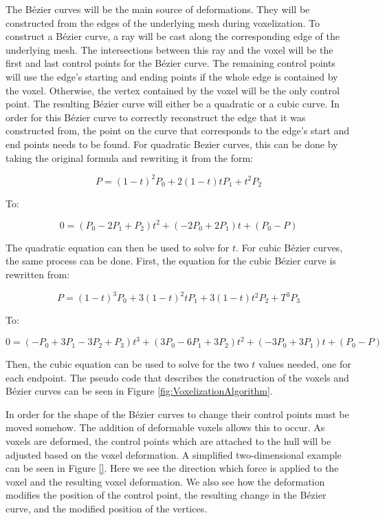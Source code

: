 The Bézier curves will be the main source of deformations. They will be constructed from the edges
of the underlying mesh during voxelization. To construct a Bézier curve, a ray will be cast along 
the corresponding edge of the underlying mesh. The intersections between this ray and the voxel will
be the first and last control points for the Bézier curve. The remaining control points will use the
edge's starting and ending points if the whole edge is contained by the voxel. Otherwise, the vertex
contained by the voxel will be the only control point. The resulting Bézier curve will either be a
quadratic or a cubic curve. In order for this Bézier curve to correctly reconstruct the edge that it
was constructed from, the point on the curve that corresponds to the edge's start and end points 
needs to be found. For quadratic Bezier curves, this can be done by taking the original formula and
rewriting it from the form:

\[P = (1 - t)^2P_0 + 2(1 - t)tP_1 + t^2 P_2\]

\begin{center}
To:
\end{center}
  
\[0 = (P_0 - 2P_1 + P_2)t^2 + (-2P_0 + 2P_1)t + (P_0 - P)\]

The quadratic equation can then be used to solve for \(t\). For cubic Bézier curves, the same 
process can be done. First, the equation for the cubic Bézier curve is rewritten from:

\[P = (1 - t)^3P_0 + 3(1 - t)^2tP_1 + 3(1 - t)t^2P_2 + T^3P_3\]

\begin{center}
To:
\end{center}

\[0 = (-P_0 + 3P_1 - 3P_2 + P_3)t^3 + (3P_0 - 6P_1 + 3P_2)t^2 + (-3P_0 + 3P_1)t + (P_0 - P)\]

Then, the cubic equation can be used to solve for the two \(t\) values needed, one for each 
endpoint. The pseudo code that describes the construction of the voxels and Bézier curves can be 
seen in Figure \ref{fig:VoxelizationAlgorithm}.

In order for the shape of the Bézier curves to change their control points must be moved somehow.
The addition of deformable voxels allows this to occur. As voxels are deformed, the control points
which are attached to the hull will be adjusted based on the voxel deformation. A simplified 
two-dimensional example can be seen in Figure \ref{}. Here we see the direction which force is 
applied to the voxel and the resulting voxel deformation. We also see how the deformation modifies
the position of the control point, the resulting change in the Bézier curve, and the modified 
position of the vertices.


